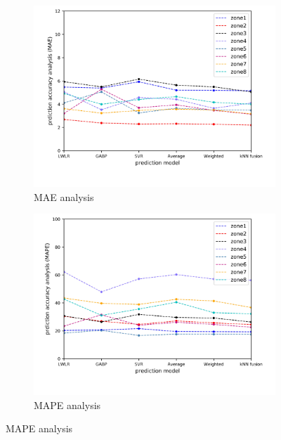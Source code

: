 \documentclass[sigconf]{acmart}
\begin{document}
\begin{figure}
  \begin{subfigure}{.5\textwidth}
    \centering
    \includegraphics[width=.8\linewidth]{MAE}  
    \caption{MAE analysis}
    \label{fig:sub-first}
  \end{subfigure}\hfil
  \begin{subfigure}{.5\textwidth}
    \centering
    \includegraphics[width=.8\linewidth]{MAPE}  
    \caption{MAPE analysis}
    \label{fig:sub-second}
  \end{subfigure}


\end{figure}
\end{document}

